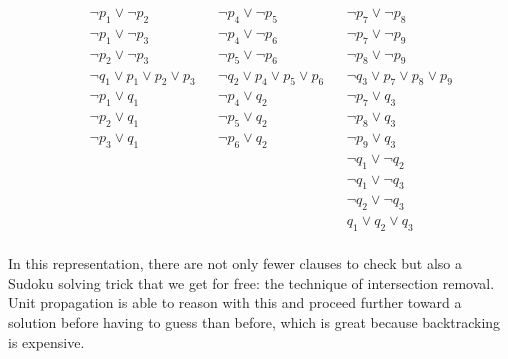\documentclass{article}
\begin{document}
\begin{align*}
  && \lnot p_1 \lor \lnot p_2
  && \lnot p_4 \lor \lnot p_5
  && \lnot p_7 \lor \lnot p_8 \\
  && \lnot p_1 \lor \lnot p_3
  && \lnot p_4 \lor \lnot p_6
  && \lnot p_7 \lor \lnot p_9 \\
  && \lnot p_2 \lor \lnot p_3
  && \lnot p_5 \lor \lnot p_6
  && \lnot p_8 \lor \lnot p_9 \\
  && \lnot q_1 \lor p_1 \lor p_2 \lor p_3
  && \lnot q_2 \lor p_4 \lor p_5 \lor p_6
  && \lnot q_3 \lor p_7 \lor p_8 \lor p_9 \\
  && \lnot p_1 \lor q_1
  && \lnot p_4 \lor q_2
  && \lnot p_7 \lor q_3 \\
  && \lnot p_2 \lor q_1
  && \lnot p_5 \lor q_2
  && \lnot p_8 \lor q_3 \\
  && \lnot p_3 \lor q_1
  && \lnot p_6 \lor q_2
  && \lnot p_9 \lor q_3 \\
  && && && \lnot q_1 \lor \lnot q_2 \\
  && && && \lnot q_1 \lor \lnot q_3 \\
  && && && \lnot q_2 \lor \lnot q_3 \\
  && && && q_1 \lor q_2 \lor q_3 \\
\end{align*}


In this representation,
there are not only fewer clauses to check
but also a Sudoku solving trick that we get for free:
the technique of intersection removal.
Unit propagation is able to reason with this
and proceed further toward a solution
before having to guess than before,
which is great because backtracking is expensive.
\end{document}
